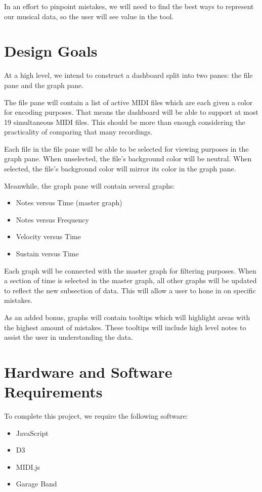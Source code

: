 \documentclass[journal]{vgtc}                %
\begin{document}
In an effort to pinpoint mistakes, we will need to find the best ways to
represent our musical data, so the user will see value in the tool.

\section{Design Goals}

At a high level, we intend to construct a dashboard split into two panes: the
file pane and the graph pane.

The file pane will contain a list of active MIDI files which are each given a
color for encoding purposes. That means the dashboard will be able to support
at most 19 simultaneous MIDI files. This should be more than enough considering
the practicality of comparing that many recordings.

Each file in the file pane will be able to be selected for viewing purposes
in the graph pane. When unselected, the file's background color will be neutral.
When selected, the file's background color will mirror its color in the graph
pane.

Meanwhile, the graph pane will contain several graphs:

\begin{itemize}
\item Notes versus Time (master graph)
\item Notes versus Frequency
\item Velocity versus Time
\item Sustain versus Time
\end{itemize}

Each graph will be connected with the master graph for filtering purposes.
When a section of time is selected in the master graph, all other graphs will
be updated to reflect the new subsection of data. This will allow a user
to hone in on specific mistakes.

As an added bonus, graphs will contain tooltips which will highlight areas with
the highest amount of mistakes. These tooltips will include high level notes
to assist the user in understanding the data.

\section{Hardware and Software Requirements}

To complete this project, we require the following software:

\begin{itemize}
\item JavaScript
\item D3
\item MIDI.js
\item Garage Band
\end{itemize}
\end{document}
